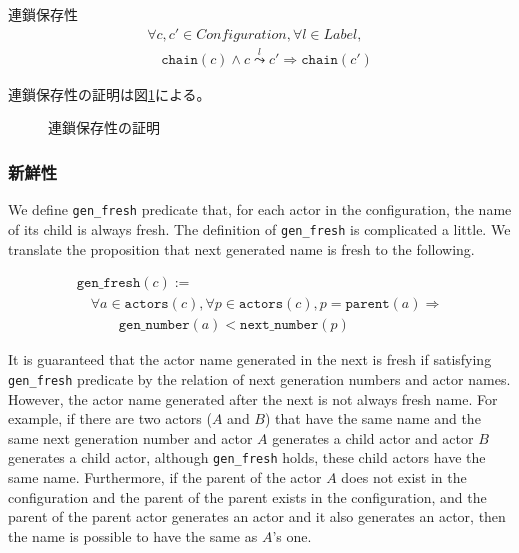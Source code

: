 \begin{lemma}{連鎖保存性}
\begin{displaymath}
  \begin{array}{l}
    \forall c, c' \in \textit{Configuration}, \forall l \in \textit{Label}, \\
    \quad \texttt{chain}(c) \wedge c \overset{l}{\leadsto} c' \Rightarrow \texttt{chain}(c')
  \end{array}
\end{displaymath}
\end{lemma}

連鎖保存性の証明は図\ref{code:formalization:chain-preservation}による。

\begin{figure}[tp]
  
  \label{code:formalization:chain-preservation}
  \caption{連鎖保存性の証明}
\end{figure}

\subsubsection{新鮮性}

We define \texttt{gen\_fresh} predicate that, for each actor in the configuration, the name of its child is always fresh.
The definition of \texttt{gen\_fresh} is complicated a little.
We translate the proposition that next generated name is fresh to the following.

\begin{displaymath}
  \begin{array}{l}
    \texttt{gen\_fresh}(c) := \\
    \quad \forall a \in \texttt{actors}(c), \forall p \in \texttt{actors}(c), p = \texttt{parent}(a) \Rightarrow \\
    \quad \quad \quad \texttt{gen\_number}(a) < \texttt{next\_number}(p)
  \end{array}
\end{displaymath}


It is guaranteed that the actor name generated in the next is fresh if satisfying \texttt{gen\_fresh} predicate by the relation of next generation numbers and actor names. %
However, the actor name generated after the next is not always fresh name.
For example, if there are two actors ($A$ and $B$) that have the same name and the same next generation number and actor $A$ generates a child actor and actor $B$ generates a child actor, although \texttt{gen\_fresh} holds, these child actors have the same name.
Furthermore, if the parent of the actor $A$ does not exist in the configuration and the parent of the parent exists in the configuration, and the parent of the parent actor generates an actor and it also generates an actor, then the name is possible to have the same as $A$'s one.


